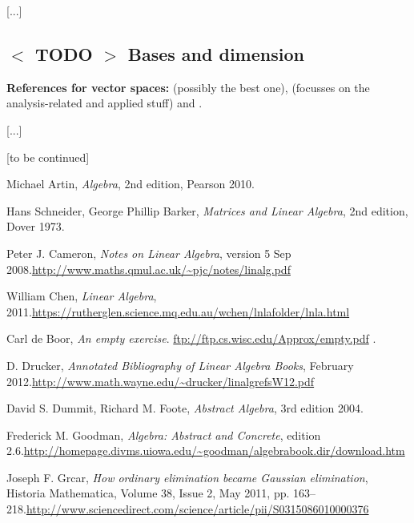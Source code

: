 \documentclass[numbers=enddot,12pt,final,onecolumn,notitlepage]{scrartcl}%
\theoremstyle{definition}
\begin{document}
[...]

\subsection{%
$<$%
TODO%
$>$
Bases and dimension}

\textbf{References for vector spaces:} \cite[\S 5.3-5.4]{LaNaSc16} (possibly
the best one), \cite[\S 2.4]{OlvSha06} (focusses on the analysis-related and
applied stuff) and \cite[Two.III]{Heffer16}.

[...]

[to be continued]

\begin{thebibliography}{9999999999}                                                                                       %


Michael Artin, \textit{Algebra}, 2nd edition,
Pearson 2010.

Hans Schneider, George Phillip Barker,
\textit{Matrices and Linear Algebra}, 2nd edition, Dover 1973.

Peter J. Cameron, \textit{Notes on Linear
Algebra}, version 5 Sep 2008.\newline\url{http://www.maths.qmul.ac.uk/~pjc/notes/linalg.pdf}

William Chen, \textit{Linear Algebra}, 2011.\newline\url{https://rutherglen.science.mq.edu.au/wchen/lnlafolder/lnla.html}

Carl de Boor, \textit{An empty exercise}.
\url{ftp://ftp.cs.wisc.edu/Approx/empty.pdf} .

D. Drucker, \textit{Annotated Bibliography of
Linear Algebra Books}, February 2012.\newline\url{http://www.math.wayne.edu/~drucker/linalgrefsW12.pdf}

David S. Dummit, Richard M. Foote,
\textit{Abstract Algebra}, 3rd edition 2004.

Frederick M. Goodman, \textit{Algebra: Abstract
and Concrete}, edition 2.6.\newline\url{http://homepage.divms.uiowa.edu/~goodman/algebrabook.dir/download.htm}

Joseph F. Grcar, \textit{How ordinary elimination
became Gaussian elimination}, Historia Mathematica, Volume 38, Issue 2, May
2011, pp. 163--218.\newline\url{http://www.sciencedirect.com/science/article/pii/S0315086010000376}


\end{thebibliography}
\end{document}
